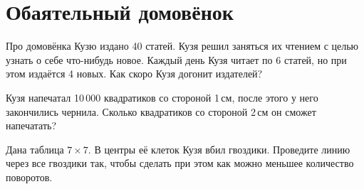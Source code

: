 \section{Обаятельный домовёнок}
\begin{itemize}

\itA Про домовёнка Кузю издано 40 статей. Кузя решил заняться их чтением с целью узнать о себе что-нибудь новое. Каждый день Кузя читает по 6 статей, но при этом издаётся 4 новых. Как скоро Кузя догонит издателей?

\itB Кузя напечатал 10\,000 квадратиков со стороной 1\,см, после этого у него закончились чернила. Сколько квадратиков со стороной 2\,см он сможет напечатать?

\itC Дана таблица $7 \times 7$. В центры её клеток Кузя вбил гвоздики. Проведите линию через все гвоздики так, чтобы сделать при этом как можно меньшее количество поворотов.
\end{itemize}